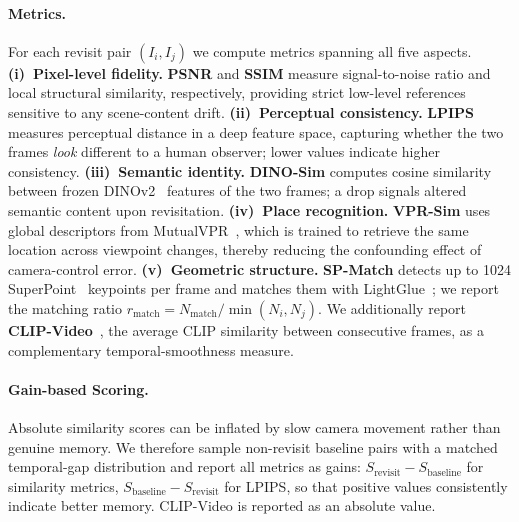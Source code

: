 \paragraph{\bf{Metrics.}}
For each revisit pair $(I_i, I_j)$ we compute metrics
spanning all five aspects.
\textbf{(i)~Pixel-level fidelity.}
\textbf{PSNR} and \textbf{SSIM} measure signal-to-noise ratio
and local structural similarity, respectively,
providing strict low-level references sensitive to any scene-content drift.
\textbf{(ii)~Perceptual consistency.}
\textbf{LPIPS}~\citep{zhang2018lpips} measures perceptual distance
in a deep feature space,
capturing whether the two frames \emph{look} different to a human observer;
lower values indicate higher consistency.
\textbf{(iii)~Semantic identity.}
\textbf{DINO-Sim} computes cosine similarity
between frozen DINOv2~\citep{oquab2023dinov2} features of the two frames;
a drop signals altered semantic content upon revisitation.
\textbf{(iv)~Place recognition.}
\textbf{VPR-Sim} uses global descriptors
from MutualVPR~\citep{gu2026mutualvpr},
which is trained to retrieve the same location across viewpoint changes,
thereby reducing the confounding effect of camera-control error.
\textbf{(v)~Geometric structure.}
\textbf{SP-Match} detects up to 1024
SuperPoint~\citep{detone2018superpoint} keypoints per frame
and matches them with LightGlue~\citep{lindenberger2023lightglue};
we report the matching ratio
$r_{\text{match}} = N_{\text{match}} / \min(N_i, N_j)$.
We additionally report \textbf{CLIP-Video}~\citep{radford2021clip},
the average CLIP similarity between consecutive frames,
as a complementary temporal-smoothness measure.

\paragraph{\bf{Gain-based Scoring.}}
Absolute similarity scores can be inflated by slow camera movement
rather than genuine memory.
We therefore sample non-revisit baseline pairs
with a matched temporal-gap distribution
and report all metrics as gains:
$S_{\mathrm{revisit}} - S_{\mathrm{baseline}}$ for similarity metrics,
$S_{\mathrm{baseline}} - S_{\mathrm{revisit}}$ for LPIPS,
so that positive values consistently indicate better memory.
CLIP-Video is reported as an absolute value.

